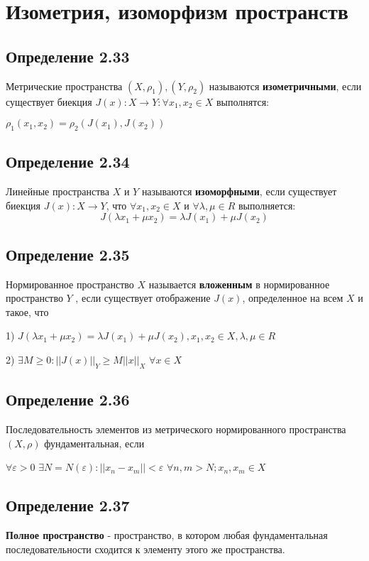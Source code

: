 \documentclass[12pt]{article}
\begin{document}
	
	
\newpage	
\section{Изометрия, изоморфизм пространств}

\subsection*{Определение 2.33}
	Метрические пространства $(X , \rho_1) , (Y , \rho_2)$ называются \textbf{изометричными}, если существует биекция  	
	$J(x) : X \to Y : \forall x_1,x_2 \in X$ выполнятся:
		
	$\rho_1(x_1,x_2) = \rho_2(J(x_1) , J(x_2))	$	



\subsection*{Определение 2.34}
Линейные пространства $X$ и $Y$ называются \textbf{изоморфными}, если
существует биекция $J(x) : X \to Y$, что $ \forall x_1, x_2 \in  X$ и $\forall \lambda , \mu \in R$ выполняется:
	$$J(\lambda x_1 + \mu x_2) = \lambda J(x_1) + \mu J(x_2)$$
	
	
\subsection*{Определение 2.35}	
	Нормированное пространство $X$ называется \textbf{вложенным} в нормированное пространство $Y$ , если 			   	существует отображение $J(x)$,	
	определенное на всем $X$ и такое, что

	1) $J(\lambda x_1 + \mu x_2) = \lambda J(x_1) + \mu J(x_2), x_1, x_2 \in X, \lambda, \mu \in R$

	2) $\exists M \ge 0 : ||J(x)||_Y \ge M||x||_X$ $\forall x \in X$
	
\subsection*{Определение 2.36}
	Последовательность элементов из метрического нормированного пространства $(X,\rho)$ фундаментальная, если
	
	$\forall \varepsilon > 0$ $\exists N = N(\varepsilon) : ||x_n - x_m|| < \varepsilon$ $\forall n, m > N; x_n, x_m \in X$  
	
\subsection*{Определение 2.37}
	\textbf{Полное пространство} - пространство, в котором любая фундаментальная последовательности сходится
	к элементу этого же пространства.
\end{document}
